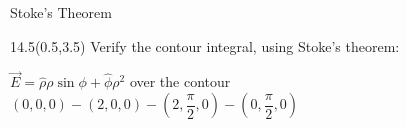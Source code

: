 
\begin{frame}{Stoke's Theorem}
\begin{textblock}{14.5}(0.5,3.5)
Verify the contour integral, using Stoke's theorem:

$\vec{E} = \hat{\rho} \rho \sin{\phi} + \hat{\phi} \rho^2$ over the contour $(0,0,0) - (2,0,0) - (2,\dfrac{\pi}{2},0) - (0,\dfrac{\pi}{2},0)$
\end{textblock}
\end{frame}









